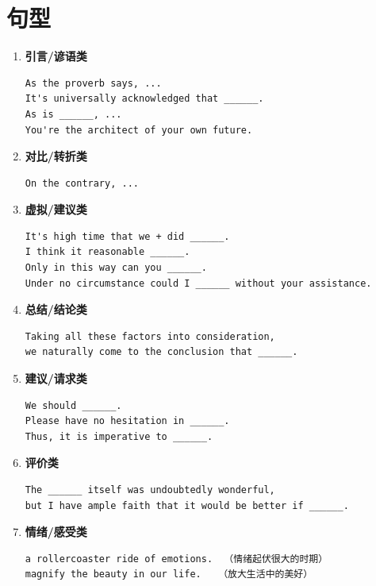 \section*{句型}

\begin{enumerate}

\item \textbf{引言/谚语类}
\begin{verbatim}
As the proverb says, ...
It's universally acknowledged that ______.
As is ______, ...
You're the architect of your own future.
\end{verbatim}

\item \textbf{对比/转折类}
\begin{verbatim}
On the contrary, ...
\end{verbatim}

\item \textbf{虚拟/建议类}
\begin{verbatim}
It's high time that we + did ______.
I think it reasonable ______.
Only in this way can you ______.
Under no circumstance could I ______ without your assistance.
\end{verbatim}

\item \textbf{总结/结论类}
\begin{verbatim}
Taking all these factors into consideration, 
we naturally come to the conclusion that ______.
\end{verbatim}

\item \textbf{建议/请求类}
\begin{verbatim}
We should ______.
Please have no hesitation in ______.
Thus, it is imperative to ______.
\end{verbatim}

\item \textbf{评价类}
\begin{verbatim}
The ______ itself was undoubtedly wonderful, 
but I have ample faith that it would be better if ______.
\end{verbatim}

\item \textbf{情绪/感受类}
\begin{verbatim}
a rollercoaster ride of emotions.  （情绪起伏很大的时期）
magnify the beauty in our life.   （放大生活中的美好）
\end{verbatim}

\end{enumerate}


